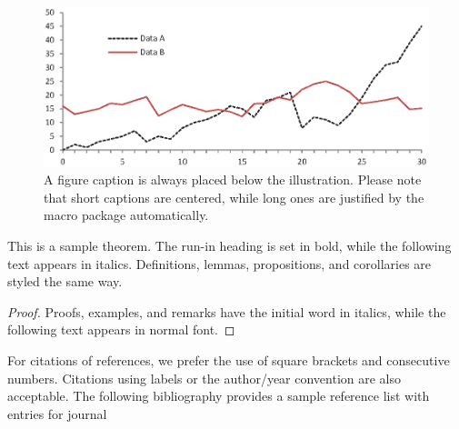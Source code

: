 \documentclass[runningheads]{llncs}
\begin{document}
\begin{figure}
\includegraphics[width=\textwidth]{fig1.eps}
\caption{A figure caption is always placed below the illustration.
Please note that short captions are centered, while long ones are
justified by the macro package automatically.} \label{fig1}
\end{figure}

\begin{theorem}
This is a sample theorem. The run-in heading is set in bold, while
the following text appears in italics. Definitions, lemmas,
propositions, and corollaries are styled the same way.
\end{theorem}
%
%
\begin{proof}
Proofs, examples, and remarks have the initial word in italics,
while the following text appears in normal font.
\end{proof}
For citations of references, we prefer the use of square brackets
and consecutive numbers. Citations using labels or the author/year
convention are also acceptable. The following bibliography provides
a sample reference list with entries for journal
%
%
%


%
\end{document}

